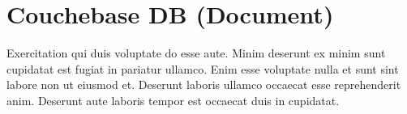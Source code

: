 
\chapter{Couchebase DB (Document)} \label{ch:couchebase}

Exercitation qui duis voluptate do esse aute. Minim deserunt ex minim sunt cupidatat est fugiat in pariatur ullamco. Enim esse voluptate nulla et sunt sint labore non ut eiusmod et. Deserunt laboris ullamco occaecat esse reprehenderit anim. Deserunt aute laboris tempor est occaecat duis in cupidatat.
